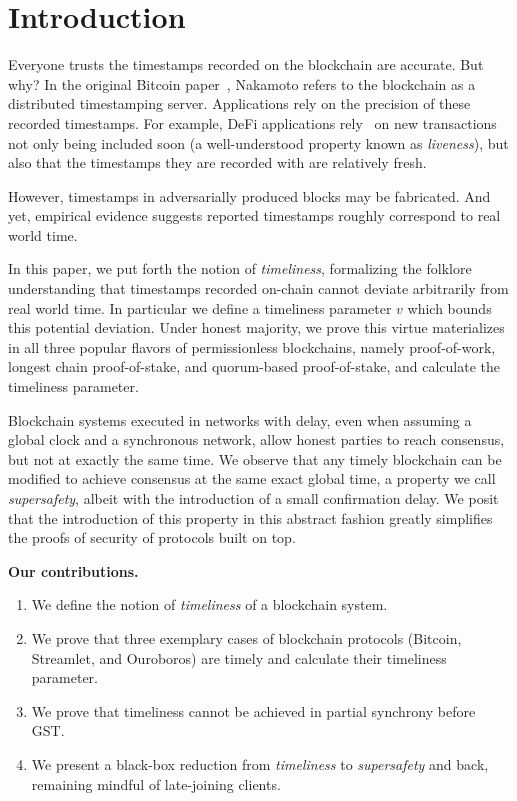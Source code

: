 \section{Introduction}
Everyone trusts the timestamps recorded on the
blockchain are accurate. But why?
In the original Bitcoin paper~\cite{bitcoin}, Nakamoto refers to the
blockchain as a distributed timestamping server.
Applications rely on the precision of these recorded timestamps.
For example, DeFi applications rely~\cite{0x-timestamp} on new transactions not only
being included soon (a well-understood property known as \emph{liveness}),
but also that the timestamps they are recorded with are relatively fresh.

However, timestamps in adversarially produced blocks may be fabricated.
And yet, empirical evidence suggests reported timestamps roughly correspond
to real world time. 

In this paper, we put forth the notion of \emph{timeliness}, formalizing the folklore
understanding that timestamps recorded on-chain cannot deviate arbitrarily
from real world time. In particular we define a timeliness parameter $v$ which bounds
this potential deviation. Under honest majority, we prove this virtue materializes in all three popular flavors of
permissionless blockchains, namely proof-of-work,
longest chain proof-of-stake, and quorum-based proof-of-stake, and calculate the
timeliness parameter.

Blockchain systems executed in networks with delay, even when assuming a global clock and
a synchronous network, allow honest parties to reach consensus, but not at exactly
the same time. We observe that any timely blockchain can be modified to achieve
consensus at the same exact global time, a property we call \emph{supersafety},
albeit with the introduction of a small confirmation delay. We posit that the introduction of this
property in this abstract fashion greatly simplifies the proofs of security of protocols built on top.

\noindent
\textbf{Our contributions.}

\begin{enumerate}
  \item We define the notion of \emph{timeliness} of a blockchain system.
  \item We prove that three exemplary cases of blockchain protocols (Bitcoin, Streamlet, and Ouroboros)
        are timely and calculate their timeliness parameter.
  \item We prove that timeliness cannot be achieved in partial synchrony before GST.
  \item We present a black-box reduction from \emph{timeliness} to \emph{supersafety} and back,
        remaining mindful of late-joining clients.
\end{enumerate}

